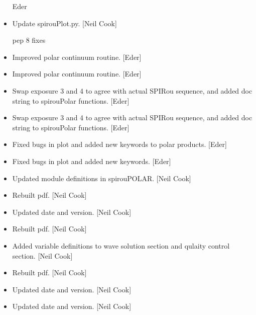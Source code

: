 \documentclass[a4paper,10pt,english]{report}
\begin{document}
\begin{itemize}
Eder

\item {} 
Update spirouPlot.py. {[}Neil Cook{]}

pep 8 fixes

\item {} 
Improved polar continuum routine. {[}Eder{]}

\item {} 
Improved polar continuum routine. {[}Eder{]}

\item {} 
Swap exposure 3 and 4 to agree with actual SPIRou sequence, and added
doc string to spirouPolar functions. {[}Eder{]}

\item {} 
Swap exposure 3 and 4 to agree with actual SPIRou sequence, and added
doc string to spirouPolar functions. {[}Eder{]}

\item {} 
Fixed bugs in plot and added new keywords to polar products. {[}Eder{]}

\item {} 
Fixed bugs in plot and added new keywords. {[}Eder{]}

\item {} 
Updated module definitions in spirouPOLAR. {[}Neil Cook{]}

\item {} 
Rebuilt pdf. {[}Neil Cook{]}

\item {} 
Updated date and version. {[}Neil Cook{]}

\item {} 
Rebuilt pdf. {[}Neil Cook{]}

\item {} 
Added variable definitions to wave solution section and qulaity
control section. {[}Neil Cook{]}

\item {} 
Rebuilt pdf. {[}Neil Cook{]}

\item {} 
Updated date and version. {[}Neil Cook{]}

\item {} 
Updated date and version. {[}Neil Cook{]}

\end{itemize}
\end{document}
